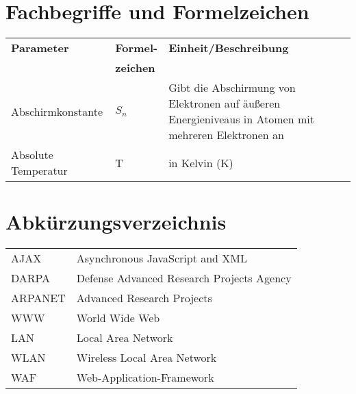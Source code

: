 \section*{Fachbegriffe und Formelzeichen}
\begin{longtable}{llp{6.5cm}}
	\textbf{Parameter} & \textbf{Formel-} & \textbf{Einheit/Beschreibung}\\
	 & \textbf{zeichen} & \\
	Abschirmkonstante & $ S_n $ & Gibt die Abschirmung von Elektronen auf äußeren Energieniveaus in Atomen mit mehreren Elektronen an\\
	Absolute Temperatur & T & in Kelvin (K)\\ 
\end{longtable}

\vspace{1cm}


\section*{Abkürzungsverzeichnis}

\begin{tabularx}{0.9\columnwidth}{lX}
	AJAX & Asynchronous JavaScript and XML \\
	DARPA & Defense Advanced Research Projects Agency\\
	ARPANET & Advanced Research Projects\\
	WWW & World Wide Web \\
	LAN & Local Area Network \\
	WLAN & Wireless Local Area Network \\
	WAF & Web-Application-Framework \\
\end{tabularx}



	
%
